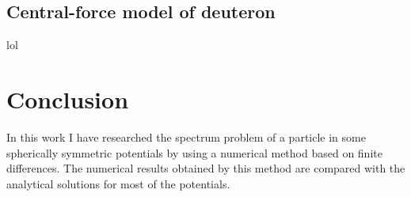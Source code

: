 \documentclass[a4paper, 12pt]{article}
\begin{document}
\subsection{Central-force model of deuteron}
lol

\section{Conclusion}
In this work I have researched the spectrum problem of a  particle in some spherically symmetric potentials by using a numerical method based on finite differences. The numerical results obtained by this method are compared with the analytical solutions for most of the potentials. 




%
%
\end{document}
